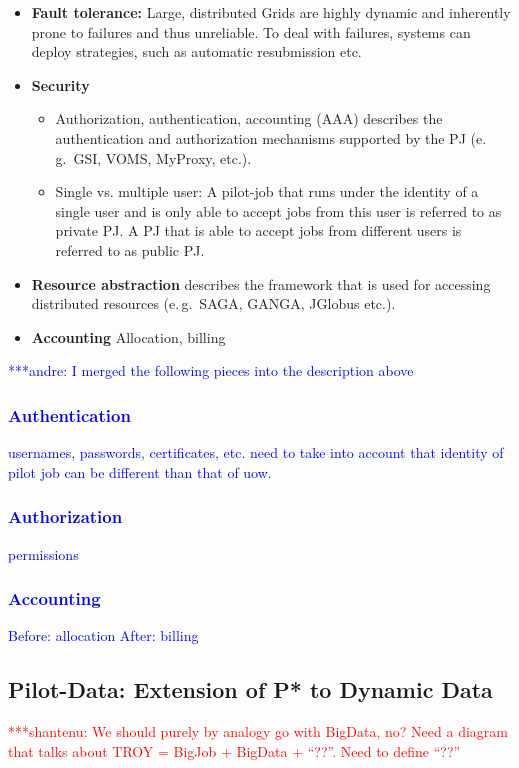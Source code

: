 \documentclass[conference,final]{IEEEtran}
\newcommand{\jhanote}[1]{ {\textcolor{red} { ***shantenu: #1 }}}
\newcommand{\alnote}[1]{ {\textcolor{blue} { ***andre: #1 }}}
\newcommand{\alnote}[1]{}
\newcommand{\jhanote}[1]{}
\begin{document}
\begin{itemize}
	\item \textbf{Fault tolerance:} Large, distributed Grids are highly dynamic 
	and inherently prone to failures and thus unreliable. To deal with failures, 
	systems can deploy strategies, such as automatic resubmission etc.
	\item \textbf{Security}
	\begin{itemize}
       \item Authorization, authentication, accounting (AAA) describes the 
       authentication and authorization mechanisms supported by the PJ (e.\,g.\  
       GSI, VOMS, MyProxy, etc.). 
	   \item Single vs. multiple user: A pilot-job that runs under the identity 
	   of a single user and is only able to accept jobs from this user is 
	   referred to as private PJ. A PJ that is able to accept jobs from 
	   different users is referred to as public PJ.
	\end{itemize}
	\item \textbf{Resource abstraction} describes the framework that is used for accessing distributed resources (e.\,g.\ SAGA, GANGA, JGlobus etc.).
	\item \textbf{Accounting} Allocation, billing
\end{itemize}


\alnote{I merged the following pieces into the description above
\subsubsection{Authentication}
usernames, passwords, certificates, etc.
need to take into account that identity of pilot job can be different than that of uow.
\subsubsection{Authorization}
permissions
\subsubsection{Accounting}
Before: allocation
After: billing 
}


\subsection{Pilot-Data: Extension of P* to Dynamic Data}
\label{sec:pilot-data}

\jhanote{We should purely by analogy go with BigData, no? Need a
  diagram that talks about TROY = BigJob + BigData + ``??''. Need to
  define ``??''}
\end{document}
